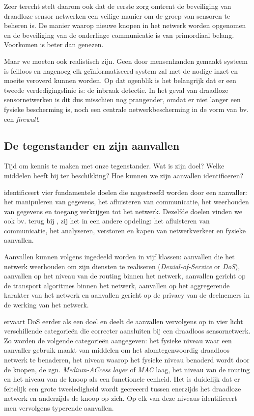Zeer terecht stelt \cite{perrig2004security} daarom ook dat de eerste zorg
omtrent de beveiliging van draadloze sensor netwerken een veilige manier om de
groep van sensoren te beheren is. De manier waarop nieuwe knopen in het netwerk
worden opgenomen en de beveiliging van de onderlinge communicatie is van
primordiaal belang. Voorkomen is beter dan genezen.

Maar we moeten ook realistisch zijn. Geen door mensenhanden gemaakt systeem is
feilloos en nagenoeg elk ge\"informatiseerd system zal met de nodige inzet en
moeite veroverd kunnen worden. Op dat ogenblik is het belangrijk dat er een
tweede verdedigingslinie is: de inbraak detectie. In het geval van draadloze
sensornetwerken is dit dus misschien nog prangender, omdat er niet langer een
fysieke bescherming is, noch een centrale netwerkbescherming in de vorm van bv.
een \emph{firewall}.

\subsection{De tegenstander en zijn aanvallen}

Tijd om kennis te maken met onze tegenstander. Wat is zijn doel? Welke middelen
heeft hij ter beschikking? Hoe kunnen we zijn aanvallen identificeren?

\cite{aschenbruck2012security} identificeert vier fundamentele doelen die
nagestreefd worden door een aanvaller: het manipuleren van gegevens, het
afluisteren van communicatie, het weerhouden van gegevens en toegang verkrijgen
tot het netwerk. Dezelfde doelen vinden we ook bv. terug bij
\cite{blilat2012wireless}, zij het in een andere opdeling: het afluisteren van
communicatie, het analyseren, verstoren en kapen van netwerkverkeer en fysieke
aanvallen.

Aanvallen kunnen volgens \cite{dargie2010fundamentals} ingedeeld worden in vijf
klassen: aanvallen die het netwerk weerhouden om zijn diensten te realiseren
(\emph{Denial-of-Service} or \emph{DoS}), aanvallen op het niveau van de
routing binnen het netwerk, aanvallen gericht op de transport algoritmes binnen
het netwerk, aanvallen op het aggregerende karakter van het netwerk en
aanvallen gericht op de privacy van de deelnemers in de werking van het netwerk.

\cite{aschenbruck2012security} ervaart DoS eerder als een doel en deelt de
aanvallen vervolgens op in vier licht verschillende categorie\"en die correcter
aansluiten bij een draadloos sensornetwerk. Zo worden de volgende categorie\"en
aangegeven: het fysieke niveau waar een aanvaller gebruik maakt van middelen om
het alomtegenwoordig draadloos netwerk te benaderen, het niveau waarop het
fysieke niveau benaderd wordt door de knopen, de zgn. \emph{Medium-ACcess
layer} of \emph{MAC} laag, het niveau van de routing en het niveau van de knoop
als een functionele eenheid. Het is duidelijk dat er feitelijk een grote
tweeledigheid wordt gecreeerd tussen enerzijds het draadloze netwerk en
anderzijds de knoop op zich. Op elk van deze niveaus identificeert men
vervolgens typerende aanvallen.

